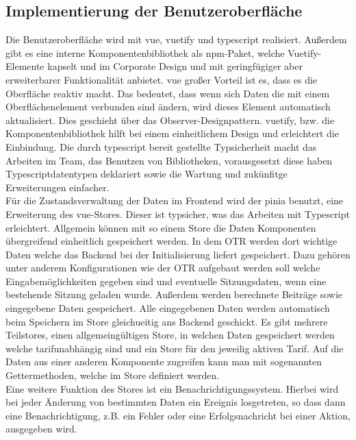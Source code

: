 \subsection{Implementierung der Benutzeroberfläche}
\label{oberflacheimplemetieren}
Die Benutzeroberfläche wird mit \gls{vue}, \gls{vuetify} und \gls{typescript} realisiert. Außerdem gibt es eine interne Komponentenbibliothek als \gls{npm}-Paket, welche Vuetify-Elemente kapselt und im Corporate Design und mit geringfügiger aber erweiterbarer Funktionalität anbietet. \gls{vue} großer Vorteil ist es, dass es die Oberfläche reaktiv macht. Das bedeutet, dass wenn sich Daten die mit einem Oberflächenelement verbunden sind ändern, wird dieses Element automatisch aktualisiert. Dies geschieht über das Observer-Designpattern. \gls{vuetify}, bzw. die Komponentenbibliothek hilft bei einem einheitlichem Design und erleichtert die Einbindung. Die durch \gls{typescript} bereit gestellte Typsicherheit macht das Arbeiten im Team, das Benutzen von Bibliotheken, vorausgesetzt diese haben Typescriptdatentypen deklariert sowie die Wartung und zukünfitge Erweiterungen einfacher.\\
Für die Zustandsverwaltung der Daten im Frontend wird der \gls{pinia} benutzt, eine Erweiterung des \gls{vue}-Stores. Dieser ist typsicher, was das Arbeiten mit Typescript erleichtert. Allgemein können mit so einem Store die Daten Komponenten übergreifend einheitlich gespeichert werden. In dem \ac{OTR} werden dort wichtige Daten welche das Backend bei der Initialisierung liefert gespeichert. Dazu gehören unter anderem Konfigurationen wie der \ac{OTR} aufgebaut werden soll welche Eingabemöglichkeiten gegeben sind und eventuelle Sitzungsdaten, wenn eine bestehende Sitzung geladen wurde. Außerdem werden berechnete Beiträge sowie eingegebene Daten gespeichert. Alle eingegebenen Daten werden automatisch beim Speichern im Store gleichueitig ans Backend geschickt. Es gibt mehrere Teilstores, einen allgemeingültigen Store, in welchen Daten gespeichert werden welche tarifunabhängig sind und ein Store für den jeweilig aktiven Tarif. Auf die Daten aus einer anderen Komponente zugreifen kann man mit sogenannten Gettermethoden, welche im Store definiert werden.\\
Eine weitere Funktion des Stores ist ein Benachrichtigungssystem. Hierbei wird bei jeder Änderung von bestimmten Daten ein Ereignis losgetreten, so dass dann eine Benachrichtigung, z.B. ein Fehler oder eine Erfolgsnachricht bei einer Aktion, ausgegeben wird.\\

